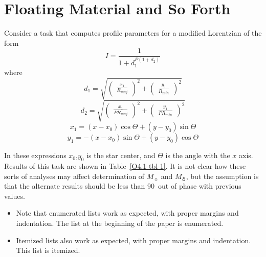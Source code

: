\documentclass[11pt,twoside]{article}  %
\begin{document}
\section{Floating Material and So Forth}

Consider a task that computes profile parameters for a modified
Lorentzian of the form
\begin{equation}
I = \frac{1}{1 + d_{1}^{P (1 + d_{2} )}}
\end{equation}
where
\begin{displaymath}
d_{1} = \sqrt{ \left( \begin{array}{c} \frac{x_{1}}{R_{maj}} 
\end{array} \right) ^{2} + 
\left( \begin{array}{c} \frac{y_{1}}{R_{min}} \end{array} \right) ^{2} }
\end{displaymath}
\begin{displaymath}
d_{2} = \sqrt{ \left( \begin{array}{c} \frac{x_{1}}{P R_{maj}}
\end{array} \right) ^{2} + 
\left( \begin{array}{c} \frac{y_{1}}{P R_{min}} \end{array} \right) ^{2} }
\end{displaymath}
\[x_{1} = (x - x_{0}) \cos \Theta + (y - y_{0}) \sin \Theta \]
\[y_{1} = -(x - x_{0}) \sin \Theta + (y - y_{0}) \cos \Theta \]

In these expressions $x_{0}$,$y_{0}$ is the star center, and $\Theta$
is the angle with the $x$ axis.  Results of this task are shown in
Table~\ref{O4.1-tbl-1}.  It is not clear how these sorts of analyses may
affect determination of $M_{\sun}$ and $M_{\earth}$, but the
assumption is that the alternate results should be less than 90\deg\
out of phase with previous values.

\begin{itemize}
\item Note that enumerated lists work as expected, with
proper margins and indentation. The list at the
beginning of the paper is enumerated.
\item Itemized lists also work as expected, with proper
margins and indentation.  This list is itemized.
\end{itemize}

%
\end{document}
